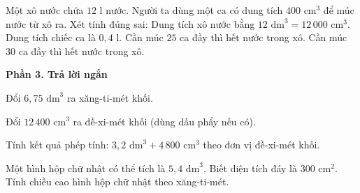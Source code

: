 \begin{ex} %
Một xô nước chứa $12\text{ l}$ nước. Người ta dùng một ca có dung tích $400\text{ cm}^3$ để múc nước từ xô ra. Xét tính đúng sai:
\choiceTF
{\True Dung tích xô nước bằng $12\text{ dm}^3 = 12\,000\text{ cm}^3$.}
{\True Dung tích chiếc ca là $0{,}4\text{ l}$.}
{Cần múc $25$ ca đầy thì hết nước trong xô.}
{\True Cần múc $30$ ca đầy thì hết nước trong xô.}
\end{ex}

\textbf{Phần 3. Trả lời ngắn}

\begin{ex} %
Đổi $6{,}75\text{ dm}^3$ ra xăng-ti-mét khối.
\end{ex}

\begin{ex} %
Đổi $12\,400\text{ cm}^3$ ra đề-xi-mét khối (dùng dấu phẩy nếu có).
\end{ex}

\begin{ex} %
Tính kết quả phép tính: $3{,}2\text{ dm}^3 + 4\,800\text{ cm}^3$ theo đơn vị đề-xi-mét khối.
\end{ex}

\begin{ex} %
Một hình hộp chữ nhật có thể tích là $5{,}4\text{ dm}^3$. Biết diện tích đáy là $300\text{ cm}^2$. Tính chiều cao hình hộp chữ nhật theo xăng-ti-mét.
\end{ex}

